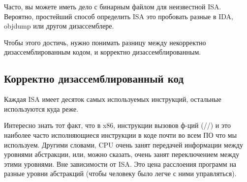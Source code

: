 \label{ISA_detect}

Часто, вы можете иметь дело с бинарным файлом для неизвестной \ac{ISA}.
Вероятно, простейший способ определить \ac{ISA} это пробовать разные в IDA, objdump или другом дизассемблере.

Чтобы этого достичь, нужно понимать разницу между некорректно дизассемблированным кодом, и корректно дизассемблированным.

\renewcommand{\CURPATH}{digging_into_code/incorrect_disassembly}


\subsection{Корректно дизассемблированный код}
\label{correctly_disasmed_code}

Каждая \ac{ISA} имеет десяток самых используемых инструкций, остальные используются куда реже.

Интересно знать тот факт, что в x86, инструкции вызовов ф-ций (\PUSH/\CALL/\ADD) и \MOV
это наиболее часто исполняющиеся инструкции в коде почти во всем ПО что мы используем.
Другими словами, \ac{CPU} очень занят передачей информации между уровнями абстракции, или, можно сказать, очень занят
переключением между этими уровнями.
Вне зависимости от \ac{ISA}.
Это цена расслоения программ на разные уровни абстракций (чтобы человеку было легче с ними управляться).

